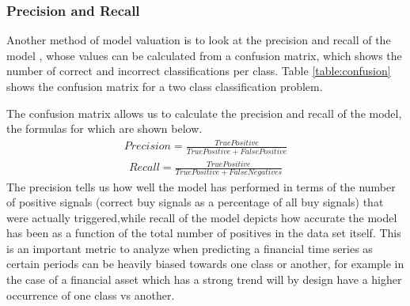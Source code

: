 \documentclass[11pt, a4paper]{article}
\begin{document}
\subsubsection{Precision and Recall}
Another method of model valuation is to look at the precision and recall of the model \cite{Patel2015}, whose values can be calculated from a confusion matrix, which shows the number of correct and incorrect classifications per class. Table \ref{table:confusion}  shows the confusion matrix for a two class classification problem.
\begin{table}[h] 
\centering      %
\caption{Confusion Matrix} %
\label{table:confusion} %
\end{table} 

The confusion matrix allows us to calculate the precision and recall of the model, the formulas for which are shown below.
\begin{align}
Precision = \frac{True Positive}{True Positive + False Positive} 
\end{align}
\begin{align}
Recall = \frac{True Positive}{True Positive + False Negatives} 
\end{align}
The precision tells us how well the model has performed in terms of the number of positive signals (correct buy signals as a percentage of all buy signals) that were actually triggered,while recall of the model depicts how accurate the model has been as a function of the total number of positives in the data set itself. This is an important metric to analyze when predicting a financial time series as certain periods can be heavily biased towards one class or another, for example in the case of a financial asset which has a strong trend will by design have a higher occurrence of one class vs another.
\end{document}
